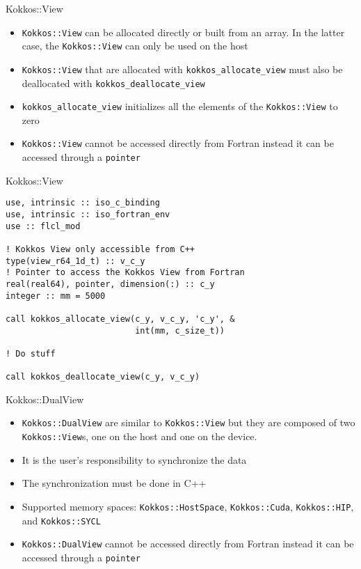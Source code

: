 \begin{frame}{Kokkos::View}
  \begin{itemize}
    \item \texttt{Kokkos::View} can be allocated directly or built from an
      array. In the latter case, the \texttt{Kokkos::View} can only be used on
      the host %
    \item \texttt{Kokkos::View} that are allocated with
      \texttt{kokkos\_allocate\_view} must also be deallocated with
      \texttt{kokkos\_deallocate\_view}
    \item \texttt{kokkos\_allocate\_view} initializes all the elements of the
      \texttt{Kokkos::View} to zero
    \item \texttt{Kokkos::View} cannot be accessed directly from Fortran instead
      it can be accessed through a \texttt{pointer}
  \end{itemize}
\end{frame}

\begin{frame}[containsverbatim]{Kokkos::View}
  \begin{verbatim}
use, intrinsic :: iso_c_binding
use, intrinsic :: iso_fortran_env
use :: flcl_mod

! Kokkos View only accessible from C++
type(view_r64_1d_t) :: v_c_y
! Pointer to access the Kokkos View from Fortran
real(real64), pointer, dimension(:) :: c_y
integer :: mm = 5000

call kokkos_allocate_view(c_y, v_c_y, 'c_y', &
                          int(mm, c_size_t))

! Do stuff

call kokkos_deallocate_view(c_y, v_c_y)
  \end{verbatim}
\end{frame}

\begin{frame}{Kokkos::DualView}
  \begin{itemize}
    \item \texttt{Kokkos::DualView} are similar to \texttt{Kokkos::View} but
      they are composed of two \texttt{Kokkos::View}s, one on the host and one on
      the device.
    \item It is the user's responsibility to synchronize the data
    \item The synchronization must be done in C++
    \item Supported memory spaces: \texttt{Kokkos::HostSpace},
      \texttt{Kokkos::Cuda}, \texttt{Kokkos::HIP}, and \texttt{Kokkos::SYCL}
    \item \texttt{Kokkos::DualView} cannot be accessed directly from Fortran instead
      it can be accessed through a \texttt{pointer}
  \end{itemize}
\end{frame}

